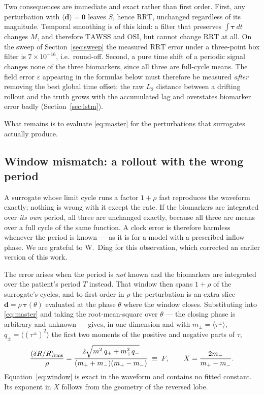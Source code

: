 \documentclass[11pt,a4paper]{article}
\newcommand{\TAWSS}{\mathrm{TAWSS}}
\newcommand{\OSI}{\mathrm{OSI}}
\newcommand{\RRT}{\mathrm{RRT}}
\newcommand{\eps}{\varepsilon}
\begin{document}
Two consequences are immediate and exact rather than first order. First, any
perturbation with $\langle\mathbf d\rangle=\mathbf 0$ leaves $S$, hence
$\RRT$, unchanged regardless of its magnitude. Temporal smoothing is of this
kind: a filter that preserves $\int\boldsymbol\tau\,dt$ changes $M$, and
therefore $\TAWSS$ and $\OSI$, but cannot change $\RRT$ at all. On the sweep
of Section~\ref{sec:sweep} the measured $\RRT$ error under a three-point box
filter is $7\times10^{-16}$, i.e.\ round-off. Second, a pure time shift of a
periodic signal changes none of the three biomarkers, since all three are
full-cycle means. The field error $\eps$ appearing in the formulas below must
therefore be measured \emph{after} removing the best global time offset; the
raw $L_2$ distance between a drifting rollout and the truth grows with the
accumulated lag and overstates biomarker error badly
(Section~\ref{sec:lstm}).

What remains is to evaluate \eqref{eq:master} for the perturbations that
surrogates actually produce.

\subsection{Window mismatch: a rollout with the wrong period}
\label{sec:window}

A surrogate whose limit cycle runs a factor $1+\rho$ fast reproduces the
waveform exactly; nothing is wrong with it except the rate. If the biomarkers
are integrated over \emph{its own} period, all three are unchanged exactly,
because all three are means over a full cycle of the same function. A clock
error is therefore harmless whenever the period is known --- as it is for a
model with a prescribed inflow phase. We are grateful to W.~Ding for this
observation, which corrected an earlier version of this work.

The error arises when the period is \emph{not} known and the biomarkers are
integrated over the patient's period $T$ instead. That window then spans
$1+\rho$ of the surrogate's cycles, and to first order in $\rho$ the
perturbation is an extra slice $\mathbf d=\rho\,\boldsymbol\tau(\theta)$
evaluated at the phase $\theta$ where the window closes. Substituting into
\eqref{eq:master} and taking the root-mean-square over $\theta$ --- the
closing phase is arbitrary and unknown --- gives, in one dimension and with
$m_\pm=\langle\tau^\pm\rangle$, $q_\pm=\langle(\tau^\pm)^2\rangle$ the first
two moments of the positive and negative parts of $\tau$,
\begin{equation}
\frac{(\delta R/R)_{\rm rms}}{\rho}
=\frac{2\sqrt{m_-^2q_++m_+^2q_-}}{(m_++m_-)(m_+-m_-)}\;\equiv\;F,
\qquad
X=\frac{2m_-}{m_+-m_-}.
\label{eq:window}
\end{equation}
Equation~\eqref{eq:window} is exact in the waveform and contains no fitted
constant. Its exponent in $X$ follows from the geometry of the reversed lobe.
\end{document}
